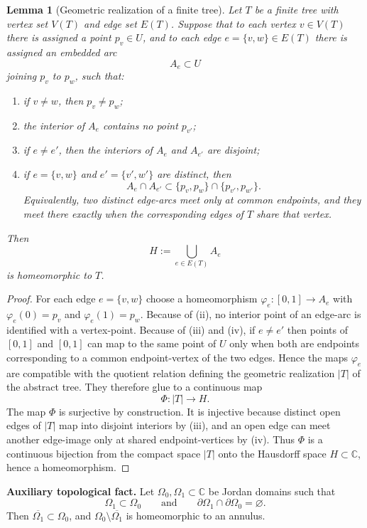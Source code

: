 \documentclass[12pt]{amsart}
\theoremstyle{definition}
\newtheorem{lemma}[theorem]{Lemma}
\theoremstyle{remark}
\begin{document}
\medskip
\begin{lemma}[Geometric realization of a finite tree]\label{lem:geometric-tree-realization}
\emph{Let $T$ be a finite tree with vertex set $V(T)$ and
edge set $E(T)$. Suppose that to each vertex $v\in V(T)$ there is assigned a point $p_v\in U$, and to each
edge $e=\{v,w\}\in E(T)$ there is assigned an embedded arc
\[
 A_e\subset U
\]
joining $p_v$ to $p_w$, such that:}
\begin{enumerate}
\item[(i)] \emph{if $v\neq w$, then $p_v\neq p_w$;}
\item[(ii)] \emph{the interior of $A_e$ contains no point $p_{v'}$;}
\item[(iii)] \emph{if $e\neq e'$, then the interiors of $A_e$ and $A_{e'}$ are disjoint;}
\item[(iv)] \emph{if $e=\{v,w\}$ and $e'=\{v',w'\}$ are distinct, then
\[
 A_e\cap A_{e'}\subset \{p_v,p_w\}\cap\{p_{v'},p_{w'}\}.
\]
Equivalently, two distinct edge-arcs meet only at common endpoints, and they meet there
exactly when the corresponding edges of $T$ share that vertex.}
\end{enumerate}
\emph{Then
\[
 H:=\bigcup_{e\in E(T)} A_e
\]
is homeomorphic to $T$.}
\end{lemma}

\begin{proof} For each edge $e=\{v,w\}$ choose a homeomorphism $\varphi_e:[0,1]\to A_e$ with $\varphi_e(0)=p_v$ and
$\varphi_e(1)=p_w$. Because of (ii), no interior point of an edge-arc is identified with a vertex-point. Because
of (iii) and (iv), if $e\neq e'$ then points of $[0,1]$ and $[0,1]$ can map to the same point of $U$ only when
both are endpoints corresponding to a common endpoint-vertex of the two edges. Hence the maps
$\varphi_e$ are compatible with the quotient relation defining the geometric realization $|T|$ of the abstract
tree. They therefore glue to a continuous map
\[
 \Phi:|T|\to H.
\]
The map $\Phi$ is surjective by construction. It is injective because distinct open edges of $|T|$ map
into disjoint interiors by (iii), and an open edge can meet another edge-image only at shared
endpoint-vertices by (iv). Thus $\Phi$ is a continuous bijection from the compact space $|T|$ onto the
Hausdorff space $H\subset\mathbb{C}$, hence a homeomorphism. \end{proof}

\medskip
\noindent\textbf{Auxiliary topological fact.}
Let $\Omega_0,\Omega_1\subset \mathbb C$ be Jordan domains such that
\[
\Omega_1\subset \Omega_0
\qquad\text{and}\qquad
\partial\Omega_1\cap \partial\Omega_0=\varnothing.
\]
Then $\overline{\Omega_1}\subset \Omega_0$, and $\Omega_0\setminus \overline{\Omega_1}$
is homeomorphic to an annulus.
\end{document}
